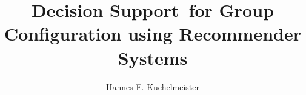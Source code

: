 \documentclass{article}
\begin{document}
\title{Decision Support for Group Configuration using Recommender Systems}
\author{Hannes F. Kuchelmeister}

\maketitle

\tableofcontents

\newpage








\printbibliography[heading=bibintoc]
\end{document}
